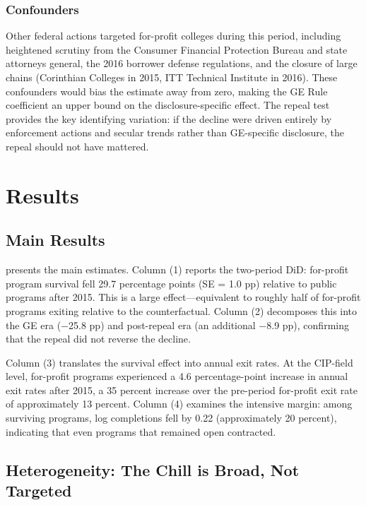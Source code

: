 \documentclass[12pt]{article}
\begin{document}
\subsubsection*{Confounders} Other federal actions targeted for-profit colleges during this period, including heightened scrutiny from the Consumer Financial Protection Bureau and state attorneys general, the 2016 borrower defense regulations, and the closure of large chains (Corinthian Colleges in 2015, ITT Technical Institute in 2016). These confounders would bias the estimate away from zero, making the GE Rule coefficient an upper bound on the disclosure-specific effect. The repeal test provides the key identifying variation: if the decline were driven entirely by enforcement actions and secular trends rather than GE-specific disclosure, the repeal should not have mattered.

\section{Results}

\subsection{Main Results}



 presents the main estimates. Column (1) reports the two-period DiD: for-profit program survival fell 29.7 percentage points (SE = 1.0 pp) relative to public programs after 2015. This is a large effect---equivalent to roughly half of for-profit programs exiting relative to the counterfactual. Column (2) decomposes this into the GE era ($-$25.8 pp) and post-repeal era (an additional $-$8.9 pp), confirming that the repeal did not reverse the decline.

Column (3) translates the survival effect into annual exit rates. At the CIP-field level, for-profit programs experienced a 4.6 percentage-point increase in annual exit rates after 2015, a 35 percent increase over the pre-period for-profit exit rate of approximately 13 percent. Column (4) examines the intensive margin: among surviving programs, log completions fell by 0.22 (approximately 20 percent), indicating that even programs that remained open contracted.

\subsection{Heterogeneity: The Chill is Broad, Not Targeted}
\end{document}
